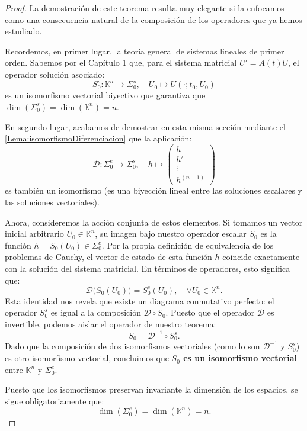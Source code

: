\begin{proof}
    La demostración de este teorema resulta muy elegante si la enfocamos como una consecuencia natural de la composición de los operadores que ya hemos estudiado. 
    
    Recordemos, en primer lugar, la teoría general de sistemas lineales de primer orden. Sabemos por el Capítulo 1 que, para el sistema matricial $U' = A(t)U$, el operador solución asociado:
    \[
        S_0^s : \mathbb{K}^n \to \Sigma_0^s, \quad U_0 \mapsto U(\cdot; t_0, U_0)
    \]
    es un isomorfismo vectorial biyectivo que garantiza que $\dim(\Sigma_0^s) = \dim(\mathbb{K}^n) = n$.
    
    En segundo lugar, acabamos de demostrar en esta misma sección mediante el \cref{Lema:isomorfismoDiferenciacion} que la aplicación:
    \[
        \mathcal{D} : \Sigma_0^e \to \Sigma_0^s, \quad h \mapsto \begin{pmatrix} h \\ h' \\ \vdots \\ h^{(n-1)} \end{pmatrix}
    \]
    es también un isomorfismo (es una biyección lineal entre las soluciones escalares y las soluciones vectoriales).
    
    Ahora, consideremos la acción conjunta de estos elementos. Si tomamos un vector inicial arbitrario $U_0 \in \mathbb{K}^n$, su imagen bajo nuestro operador escalar $S_0$ es la función $h = S_0(U_0) \in \Sigma_0^e$. Por la propia definición de equivalencia de los problemas de Cauchy, el vector de estado de esta función $h$ coincide exactamente con la solución del sistema matricial. En términos de operadores, esto significa que:
    \[
        \mathcal{D} \big( S_0(U_0) \big) = S_0^s(U_0), \quad \forall U_0 \in \mathbb{K}^n.
    \]
    Esta identidad nos revela que existe un diagrama conmutativo perfecto: el operador $S_0^s$ es igual a la composición $\mathcal{D} \circ S_0$. Puesto que el operador $\mathcal{D}$ es invertible, podemos aislar el operador de nuestro teorema:
    \[
        S_0 = \mathcal{D}^{-1} \circ S_0^s.
    \]
    Dado que la composición de dos isomorfismos vectoriales (como lo son $\mathcal{D}^{-1}$ y $S_0^s$) es otro isomorfismo vectorial, concluimos que \textbf{$S_0$ es un isomorfismo vectorial} entre $\mathbb{K}^n$ y $\Sigma_0^e$. 
    
    Puesto que los isomorfismos preservan invariante la dimensión de los espacios, se sigue obligatoriamente que:
    \[
        \dim(\Sigma_0^e) = \dim(\mathbb{K}^n) = n.
    \]


\end{proof}
